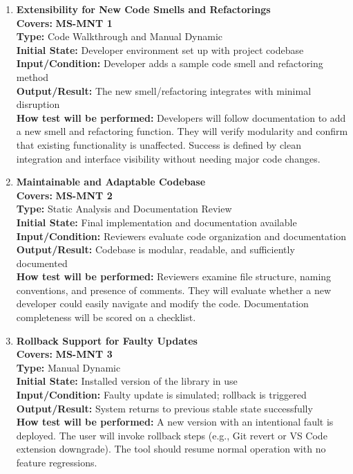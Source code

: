 \documentclass[12pt, titlepage]{article}
\begin{document}
\begin{enumerate}[label={\bf \textcolor{Maroon}{test-MS-\arabic*}}, wide=0pt, font=\itshape]

  \item \textbf{Extensibility for New Code Smells and Refactorings} \\[2mm]
    \textbf{Covers:} \textbf{MS-MNT 1} \\ 
    \textbf{Type:} Code Walkthrough and Manual Dynamic \\
    \textbf{Initial State:} Developer environment set up with project codebase \\
    \textbf{Input/Condition:} Developer adds a sample code smell and refactoring method \\
    \textbf{Output/Result:} The new smell/refactoring integrates with minimal disruption \\[2mm]
    \textbf{How test will be performed:} Developers will follow documentation to add a new smell and refactoring function. They will verify modularity and confirm that existing functionality is unaffected. Success is defined by clean integration and interface visibility without needing major code changes.

  \item \textbf{Maintainable and Adaptable Codebase} \\[2mm]
    \textbf{Covers:} \textbf{MS-MNT 2} \\ 
    \textbf{Type:} Static Analysis and Documentation Review \\
    \textbf{Initial State:} Final implementation and documentation available \\
    \textbf{Input/Condition:} Reviewers evaluate code organization and documentation \\
    \textbf{Output/Result:} Codebase is modular, readable, and sufficiently documented \\[2mm]
    \textbf{How test will be performed:} Reviewers examine file structure, naming conventions, and presence of comments. They will evaluate whether a new developer could easily navigate and modify the code. Documentation completeness will be scored on a checklist.

  \item \textbf{Rollback Support for Faulty Updates} \\[2mm]
    \textbf{Covers:} \textbf{MS-MNT 3} \\ 
    \textbf{Type:} Manual Dynamic \\
    \textbf{Initial State:} Installed version of the library in use \\
    \textbf{Input/Condition:} Faulty update is simulated; rollback is triggered \\
    \textbf{Output/Result:} System returns to previous stable state successfully \\[2mm]
    \textbf{How test will be performed:} A new version with an intentional fault is deployed. The user will invoke rollback steps (e.g., Git revert or VS Code extension downgrade). The tool should resume normal operation with no feature regressions.
\end{enumerate}
\end{document}

